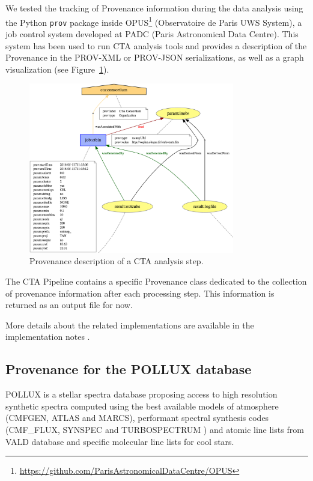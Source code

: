 We tested the tracking of Provenance information during the data analysis using the Python \texttt{prov} package inside OPUS\footnote{\url{https://github.com/ParisAstronomicalDataCentre/OPUS}} (Observatoire de Paris UWS System), a job control system developed at PADC (Paris Astronomical Data Centre). This system has been used to run CTA analysis tools and provides a description of the Provenance in the PROV-XML or PROV-JSON serializations, as well as a graph visualization (see Figure~\ref{fig:cta_prov}).

\begin{figure}
\centering
\includegraphics[width=0.8\textwidth]{CTA_prov.png}
\caption[Provenance description of a CTA analysis step]{Provenance description of a CTA analysis step.}
\label{fig:cta_prov}
\end{figure}

The CTA Pipeline contains a specific Provenance class dedicated to the collection of provenance information after each processing step. This information is returned as an output file for now.

More details about the related implementations are available in the implementation notes \citep{std:ProvenanceImplementationNote}.


\subsection{Provenance for the POLLUX database}

POLLUX is a stellar spectra database proposing access to high resolution synthetic spectra computed using the best available models of atmosphere (CMFGEN, ATLAS and MARCS), performant spectral synthesis codes (CMF\_FLUX, SYNSPEC and TURBOSPECTRUM ) and atomic line lists from VALD database and specific molecular line lists for cool stars. 

